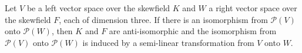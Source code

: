 Let $V$ be a left vector space over the skewfield $K$ and $W$ a right vector space over the skewfield $F$, each of dimension three. If there is an isomorphism from $\mathcal{P}(V)$ onto $\mathcal{P}(W)$, then $K$ and $F$ are anti-isomorphic and the isomorphism from $\mathcal{P}(V)$ onto $\mathcal{P}(W)$ is induced by a semi-linear transformation from $V$ onto $W$.
